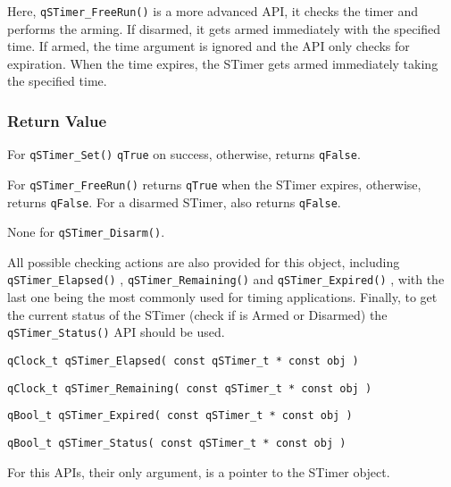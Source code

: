 Here, \lstinline{qSTimer_FreeRun()} is a more advanced API, it checks the timer and performs the arming. If disarmed, it gets armed immediately with the specified time. If armed, the time argument is ignored and the API only checks for expiration. When the time expires, the STimer gets armed immediately taking the specified time.

\subsubsection*{Return Value}
For \lstinline{qSTimer_Set()} \lstinline{qTrue} on success, otherwise, returns \lstinline{qFalse}.

For \lstinline{qSTimer_FreeRun()} returns \lstinline{qTrue} when the STimer expires, otherwise, returns \lstinline{qFalse}. For a disarmed STimer, also returns \lstinline{qFalse}. 

None for \lstinline{qSTimer_Disarm()}.

\noindent\hrulefill

\medskip
All possible checking actions are also provided for this object, including \lstinline{qSTimer_Elapsed()} , \lstinline{qSTimer_Remaining()}  and \lstinline{qSTimer_Expired()} , with the last one being the most commonly used for timing applications.
Finally, to get the current status of the STimer (check if is Armed or Disarmed) the \lstinline{qSTimer_Status()}  API should be used.
\medskip

\begin{lstlisting}[style=CStyle]
qClock_t qSTimer_Elapsed( const qSTimer_t * const obj )
\end{lstlisting}

\begin{lstlisting}[style=CStyle]
qClock_t qSTimer_Remaining( const qSTimer_t * const obj )
\end{lstlisting}

\begin{lstlisting}[style=CStyle]
qBool_t qSTimer_Expired( const qSTimer_t * const obj )
\end{lstlisting}

\begin{lstlisting}[style=CStyle]
qBool_t qSTimer_Status( const qSTimer_t * const obj )
\end{lstlisting}

For this APIs, their only argument, is a pointer to the STimer object.

